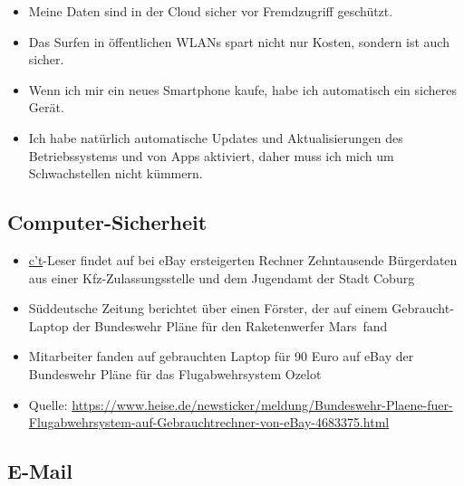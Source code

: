 \begin{frame}
\begin{itemize}
	\item Meine Daten sind in der Cloud sicher vor Fremdzugriff geschützt.
	\item Das Surfen in öffentlichen WLANs spart nicht nur Kosten, sondern ist auch sicher.
	\item Wenn ich mir ein neues Smartphone kaufe, habe ich automatisch ein sicheres Gerät.
	\item Ich habe natürlich automatische Updates und Aktualisierungen des Betriebssystems und von Apps aktiviert, daher muss ich mich um Schwachstellen nicht kümmern.
\end{itemize}
\end{frame}

\subsection{Computer-Sicherheit}


\begin{frame}
\begin{itemize}
	\item \href{https://www.heise.de/ct/}{c't}-Leser findet auf bei eBay ersteigerten Rechner Zehntausende Bürgerdaten aus einer Kfz-Zulassungsstelle und dem Jugendamt der Stadt Coburg
	\item Süddeutsche Zeitung berichtet über einen Förster, der auf einem Gebraucht-Laptop der Bundeswehr Pläne für den Raketenwerfer \glqq Mars\grqq\ fand
	\item Mitarbeiter fanden auf gebrauchten Laptop für 90 Euro auf eBay der Bundeswehr Pläne für das Flugabwehrsystem \glqq Ozelot\grqq
	\item \scriptsize{Quelle: \href{https://www.heise.de/newsticker/meldung/Bundeswehr-Plaene-fuer-Flugabwehrsystem-auf-Gebrauchtrechner-von-eBay-4683375.html}{https://www.heise.de/newsticker/meldung/Bundeswehr-Plaene-fuer-Flugabwehrsystem-auf-Gebrauchtrechner-von-eBay-4683375.html}}
\end{itemize}
\end{frame}

\subsection{E-Mail}

